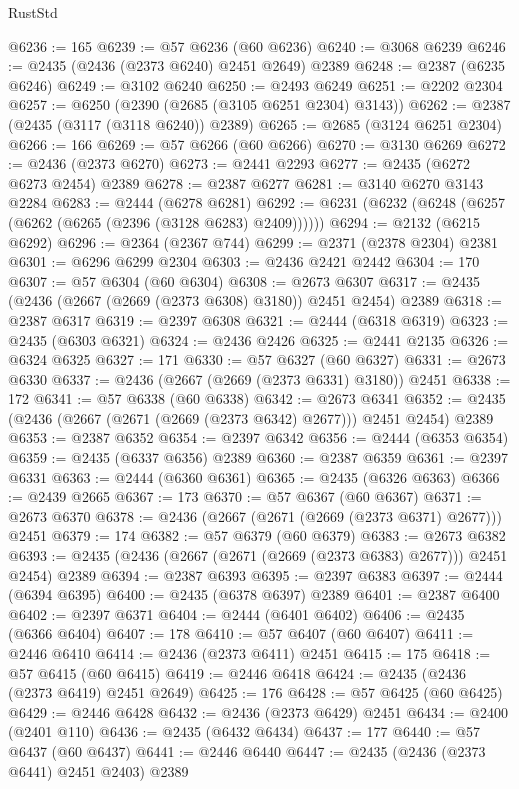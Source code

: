 \begin{lexlean}{RustStd}
\begin{coremodule}
@6236 := 165
@6239 := @57 @6236 (@60 @6236)
@6240 := @3068 @6239
@6246 := @2435 (@2436 (@2373 @6240) @2451 @2649) @2389
@6248 := @2387 (@6235 @6246)
@6249 := @3102 @6240
@6250 := @2493 @6249
@6251 := @2202 @2304
@6257 := @6250 (@2390 (@2685 (@3105 @6251 @2304) @3143))
@6262 := @2387 (@2435 (@3117 (@3118 @6240)) @2389)
@6265 := @2685 (@3124 @6251 @2304)
@6266 := 166
@6269 := @57 @6266 (@60 @6266)
@6270 := @3130 @6269
@6272 := @2436 (@2373 @6270)
@6273 := @2441 @2293
@6277 := @2435 (@6272 @6273 @2454) @2389
@6278 := @2387 @6277
@6281 := @3140 @6270 @3143 @2284
@6283 := @2444 (@6278 @6281)
@6292 := @6231 (@6232 (@6248 (@6257 (@6262 (@6265 (@2396 (@3128 @6283) @2409))))))
@6294 := @2132 (@6215 @6292)
@6296 := @2364 (@2367 @744)
@6299 := @2371 (@2378 @2304) @2381
@6301 := @6296 @6299 @2304
@6303 := @2436 @2421 @2442
@6304 := 170
@6307 := @57 @6304 (@60 @6304)
@6308 := @2673 @6307
@6317 := @2435 (@2436 (@2667 (@2669 (@2373 @6308) @3180)) @2451 @2454) @2389
@6318 := @2387 @6317
@6319 := @2397 @6308
@6321 := @2444 (@6318 @6319)
@6323 := @2435 (@6303 @6321)
@6324 := @2436 @2426
@6325 := @2441 @2135
@6326 := @6324 @6325
@6327 := 171
@6330 := @57 @6327 (@60 @6327)
@6331 := @2673 @6330
@6337 := @2436 (@2667 (@2669 (@2373 @6331) @3180)) @2451
@6338 := 172
@6341 := @57 @6338 (@60 @6338)
@6342 := @2673 @6341
@6352 := @2435 (@2436 (@2667 (@2671 (@2669 (@2373 @6342) @2677))) @2451 @2454) @2389
@6353 := @2387 @6352
@6354 := @2397 @6342
@6356 := @2444 (@6353 @6354)
@6359 := @2435 (@6337 @6356) @2389
@6360 := @2387 @6359
@6361 := @2397 @6331
@6363 := @2444 (@6360 @6361)
@6365 := @2435 (@6326 @6363)
@6366 := @2439 @2665
@6367 := 173
@6370 := @57 @6367 (@60 @6367)
@6371 := @2673 @6370
@6378 := @2436 (@2667 (@2671 (@2669 (@2373 @6371) @2677))) @2451
@6379 := 174
@6382 := @57 @6379 (@60 @6379)
@6383 := @2673 @6382
@6393 := @2435 (@2436 (@2667 (@2671 (@2669 (@2373 @6383) @2677))) @2451 @2454) @2389
@6394 := @2387 @6393
@6395 := @2397 @6383
@6397 := @2444 (@6394 @6395)
@6400 := @2435 (@6378 @6397) @2389
@6401 := @2387 @6400
@6402 := @2397 @6371
@6404 := @2444 (@6401 @6402)
@6406 := @2435 (@6366 @6404)
@6407 := 178
@6410 := @57 @6407 (@60 @6407)
@6411 := @2446 @6410
@6414 := @2436 (@2373 @6411) @2451
@6415 := 175
@6418 := @57 @6415 (@60 @6415)
@6419 := @2446 @6418
@6424 := @2435 (@2436 (@2373 @6419) @2451 @2649)
@6425 := 176
@6428 := @57 @6425 (@60 @6425)
@6429 := @2446 @6428
@6432 := @2436 (@2373 @6429) @2451
@6434 := @2400 (@2401 @110)
@6436 := @2435 (@6432 @6434)
@6437 := 177
@6440 := @57 @6437 (@60 @6437)
@6441 := @2446 @6440
@6447 := @2435 (@2436 (@2373 @6441) @2451 @2403) @2389

\end{coremodule}
\end{lexlean}
